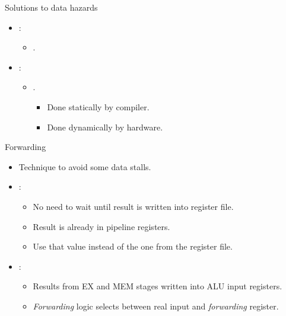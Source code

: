 \begin{frame}[t]{Solutions to data hazards}
\begin{itemize}
  \item {}:
    \begin{itemize}
      \item {}.
    \end{itemize}

  \item {}:
    \begin{itemize}
      \item {}.
        \begin{itemize}
          \item Done statically by compiler.
          \item Done dynamically by hardware.
        \end{itemize}
    \end{itemize}  
\end{itemize}
 \end{frame}

\begin{frame}[t]{Forwarding}
\begin{itemize}
  \item Technique to avoid some data stalls.

  \item {}:
    \begin{itemize}
      \item No need to wait until result is written into register file.
      \item Result is already in pipeline registers.
      \item Use that value instead of the one from the register file.
    \end{itemize}

  \item {}:
    \begin{itemize}
      \item Results from EX and MEM stages written into ALU input registers.
      \item \emph{Forwarding} logic selects between real input and \emph{forwarding} register.
    \end{itemize}
\end{itemize}
\end{frame}

